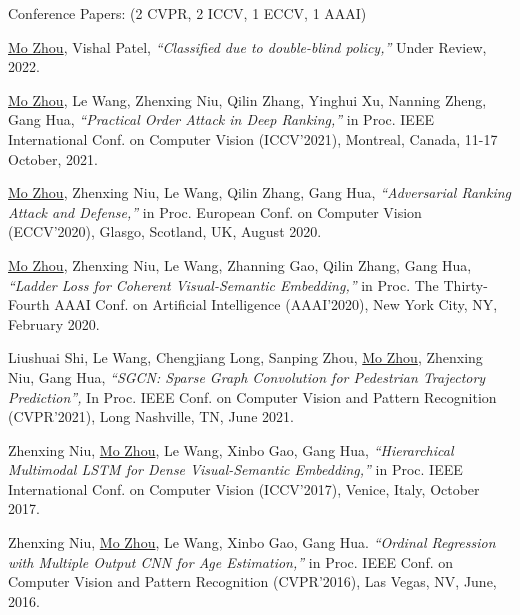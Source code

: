 \documentclass[10pt,margin,line,pifont,palatino,courier]{res}
\begin{document}
\begin{resume}
	{\sc Conference Papers:}\hfill
	(2 CVPR, 2 ICCV, 1 ECCV, 1 AAAI)\\

\begin{enumerate}[noitemsep, leftmargin=*, label={[C0{\arabic*}]}]

\item \underline{Mo Zhou}, Vishal Patel,
	\textit{``Classified due to double-blind policy,''} Under Review, 2022.

\item \underline{Mo Zhou}, Le Wang, Zhenxing Niu, Qilin Zhang, Yinghui Xu, Nanning Zheng, Gang Hua,
\textit{``Practical Order Attack in Deep Ranking,''}
in Proc. IEEE International Conf. on Computer Vision (ICCV'2021),
Montreal, Canada, 11-17 October, 2021.

\item \underline{Mo Zhou}, Zhenxing Niu, Le Wang, Qilin Zhang, Gang Hua,
\textit{``Adversarial Ranking Attack and Defense,''}
in Proc. European Conf. on Computer Vision (ECCV'2020),
Glasgo, Scotland, UK, August 2020.

\item  \underline{Mo Zhou}, Zhenxing Niu, Le Wang, Zhanning Gao, Qilin Zhang, Gang Hua,
\textit{``Ladder Loss for Coherent Visual-Semantic Embedding,''}
in Proc. The Thirty-Fourth AAAI Conf. on Artificial Intelligence (AAAI'2020),
New York City, NY, February 2020.

\item Liushuai Shi, Le Wang, Chengjiang Long, Sanping Zhou, \underline{Mo Zhou}, Zhenxing Niu, Gang Hua,
\textit{``SGCN: Sparse Graph Convolution for Pedestrian Trajectory Prediction'',}
In Proc. IEEE Conf. on Computer Vision and Pattern Recognition (CVPR'2021),
Long Nashville, TN, June 2021.

\item Zhenxing Niu, \underline{Mo Zhou}, Le Wang, Xinbo Gao, Gang Hua,
\textit{``Hierarchical Multimodal LSTM for Dense Visual-Semantic Embedding,''}
in Proc. IEEE International Conf. on Computer Vision (ICCV'2017),
Venice, Italy, October 2017.

\item Zhenxing Niu, \underline{Mo Zhou}, Le Wang, Xinbo Gao, Gang Hua.
\textit{``Ordinal Regression with Multiple Output CNN for Age Estimation,''}
in Proc. IEEE Conf. on Computer Vision and Pattern Recognition (CVPR'2016),
Las Vegas, NV, June, 2016.

\end{enumerate}


\end{resume}
\end{document}
